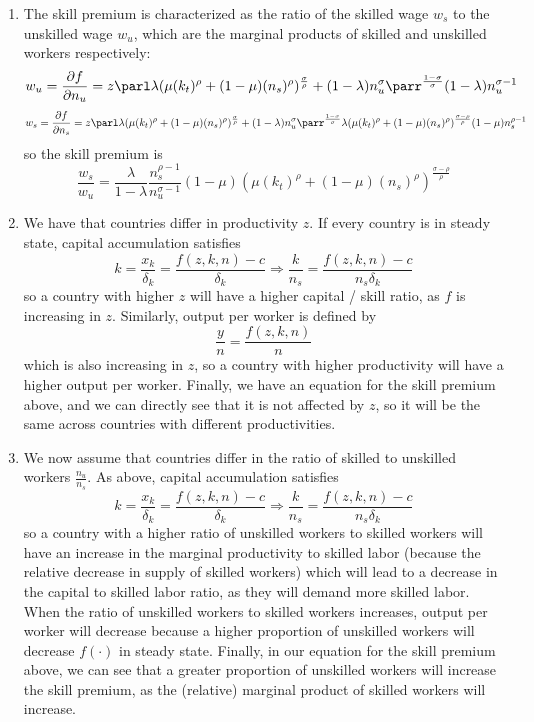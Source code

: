 \documentclass[10pt]{article}
\begin{document}
\begin{enumerate}
	\item The skill premium is characterized as the ratio of the skilled wage $w_s$ to the unskilled wage $w_u$, which are the marginal products of skilled and unskilled workers respectively: \[w_u = \frac{\partial f}{\partial n_u} = z \parl \lambda(\mu (k_t)^\rho + (1-\mu)(n_s)^\rho)^{\frac{\sigma}{\rho}}+ (1-\lambda)n_u^\sigma\parr^\frac{1-\sigma}{\sigma} (1-\lambda)n_u^{\sigma-1}\]\[w_s = \frac{\partial f}{\partial n_s} = z\parl \lambda(\mu (k_t)^\rho + (1-\mu)(n_s)^\rho)^{\frac{\sigma}{\rho}}+ (1-\lambda)n_u^\sigma\parr^\frac{1-\sigma}{\sigma} \lambda(\mu(k_t)^\rho + (1-\mu)(n_s)^\rho)^\frac{\sigma - \rho}{\rho}(1-\mu)n_s^{\rho - 1}\]so the skill premium is \[\frac{w_s}{w_u} = \frac{\lambda}{1-\lambda}\frac{n_s^{\rho-1}}{n_u^{\sigma-1}} (1-\mu)(\mu(k_t)^\rho + (1-\mu)(n_s)^\rho)^\frac{\sigma - \rho}{\rho}\]
	\item We have that countries differ in productivity $z$. If every country is in steady state, capital accumulation satisfies \[k = \frac{x_k}{\delta_k} = \frac{f(z,k,n) - c}{\delta_k} \Longrightarrow \frac{k}{n_s} = \frac{f(z,k,n) - c}{n_s\delta_k} \]so a country with higher $z$ will have a higher capital / skill ratio, as $f$ is increasing in $z$. Similarly, output per worker is defined by \[\frac{y}{n} = \frac{f(z,k,n)}{n}\]which is also increasing in $z$, so a country with higher productivity will have a higher output per worker. Finally, we have an equation for the skill premium above, and we can directly see that it is not affected by $z$, so it will be the same across countries with different productivities.
	\item We now assume that countries differ in the ratio of skilled to unskilled workers $\frac{n_u}{n_s}$. As above, capital accumulation satisfies  \[k = \frac{x_k}{\delta_k} = \frac{f(z,k,n) - c}{\delta_k} \Longrightarrow \frac{k}{n_s} = \frac{f(z,k,n) - c}{n_s\delta_k} \]so a country with a higher ratio of unskilled workers to skilled workers will have an increase in the marginal productivity to skilled labor (because the relative decrease in supply of skilled workers) which will lead to a decrease in the capital to skilled labor ratio, as they will demand more skilled labor. When the ratio of unskilled workers to skilled workers increases, output per worker will decrease because a higher proportion of unskilled workers will decrease $f(\cdot)$ in steady state. Finally, in our equation for the skill premium above, we can see that a greater proportion of unskilled workers will increase the skill premium, as the (relative) marginal product of skilled workers will increase.

\end{enumerate}
\end{document}

